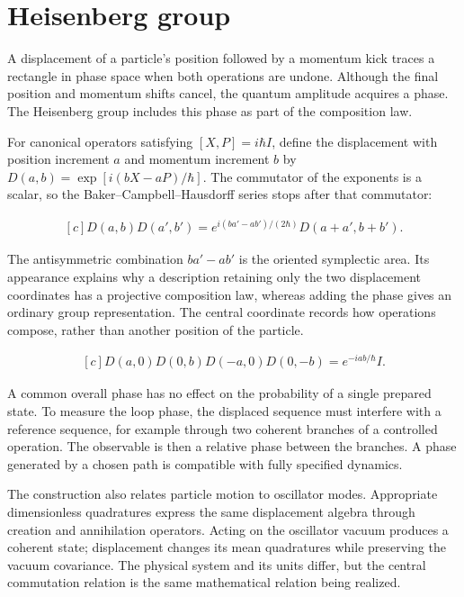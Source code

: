\documentclass[11pt,oneside]{book}
\newenvironment{centeredalign}{\[\begin{gathered}[c]}{\end{gathered}\]}
\begin{document}
\section{Heisenberg group}

\label{topic:heisenberg-group}

A displacement of a particle's position followed by a momentum kick traces a rectangle in phase space when both operations are undone. Although the final position and momentum shifts cancel, the quantum amplitude acquires a phase. The Heisenberg group includes this phase as part of the composition law.

For canonical operators satisfying \([X,P]=i\hbar I\), define the displacement with position increment \(a\) and momentum increment \(b\) by \(D(a,b)=\exp[i(bX-aP)/\hbar]\). The commutator of the exponents is a scalar, so the Baker--Campbell--Hausdorff series stops after that commutator:

\begin{centeredalign}
D(a,b)D(a',b')=
e^{i(ba'-ab')/(2\hbar)}D(a+a',b+b').
\end{centeredalign}

The antisymmetric combination \(ba'-ab'\) is the oriented symplectic area. Its appearance explains why a description retaining only the two displacement coordinates has a projective composition law, whereas adding the phase gives an ordinary group representation. The central coordinate records how operations compose, rather than another position of the particle.

\begin{centeredalign}
D(a,0)D(0,b)D(-a,0)D(0,-b)=e^{-iab/\hbar}I.
\end{centeredalign}

A common overall phase has no effect on the probability of a single prepared state. To measure the loop phase, the displaced sequence must interfere with a reference sequence, for example through two coherent branches of a controlled operation. The observable is then a relative phase between the branches. A phase generated by a chosen path is compatible with fully specified dynamics.

The construction also relates particle motion to oscillator modes. Appropriate dimensionless quadratures express the same displacement algebra through creation and annihilation operators. Acting on the oscillator vacuum produces a coherent state; displacement changes its mean quadratures while preserving the vacuum covariance. The physical system and its units differ, but the central commutation relation is the same mathematical relation being realized.
\end{document}
